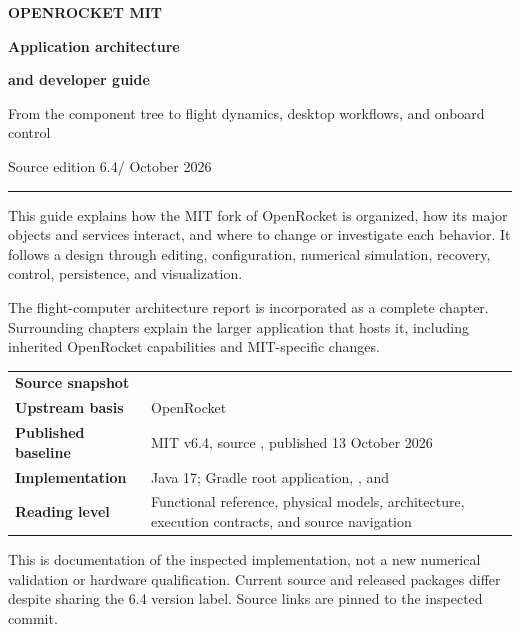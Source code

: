 

\hypersetup{pageanchor=false}
\begin{titlepage}
\color{ink}
{\sffamily\bfseries\Large OPENROCKET MIT\par}
\vspace{1.2cm}
{\sffamily\bfseries\Huge Application architecture\par}
\vspace{0.2cm}
{\sffamily\bfseries\Huge and developer guide\par}
\vspace{0.7cm}
{\Large From the component tree to flight dynamics, desktop workflows, and onboard control\par}
\vspace{0.8cm}
{\large Source edition 6.4\quad / October 2026\par}
\vspace{0.6cm}\hrule height 1pt\vspace{0.5cm}
This guide explains how the MIT fork of OpenRocket is organized, how its major objects and services interact, and where to change or investigate each behavior. It follows a design through editing, configuration, numerical simulation, recovery, control, persistence, and visualization.

The flight-computer architecture report is incorporated as a complete chapter. Surrounding chapters explain the larger application that hosts it, including inherited OpenRocket capabilities and MIT-specific changes.
\vspace{0.5cm}
\begin{tabularx}{\linewidth}{@{}>{\bfseries}L{3.1cm}Y@{}}\toprule
Source snapshot & \\
Upstream basis & OpenRocket \\
Published baseline & MIT v6.4, source , published 13 October 2026\\
Implementation & Java 17; Gradle root application, , and \\
Reading level & Functional reference, physical models, architecture, execution contracts, and source navigation\\\bottomrule
\end{tabularx}
\vfill
{\small\color{muted}This is documentation of the inspected implementation, not a new numerical validation or hardware qualification. Current source and released packages differ despite sharing the 6.4 version label. Source links are pinned to the inspected commit.}\par
\end{titlepage}
